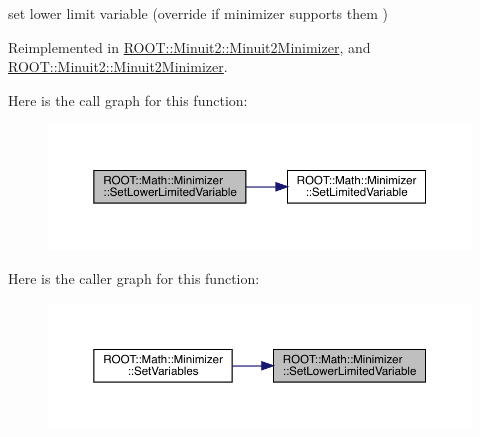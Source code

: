 set lower limit variable (override if minimizer supports them ) 



Reimplemented in \mbox{\hyperlink{classROOT_1_1Minuit2_1_1Minuit2Minimizer_af38926946e36f7030cfc1c298ab9b222}{R\+O\+O\+T\+::\+Minuit2\+::\+Minuit2\+Minimizer}}, and \mbox{\hyperlink{classROOT_1_1Minuit2_1_1Minuit2Minimizer_af38926946e36f7030cfc1c298ab9b222}{R\+O\+O\+T\+::\+Minuit2\+::\+Minuit2\+Minimizer}}.

Here is the call graph for this function\+:
\nopagebreak
\begin{figure}[H]
\begin{center}
\leavevmode
\includegraphics[width=350pt]{dc/dc4/classROOT_1_1Math_1_1Minimizer_a0fed20bdc58d05ce2b92d2bf47594dfb_cgraph}
\end{center}
\end{figure}
Here is the caller graph for this function\+:\nopagebreak
\begin{figure}[H]
\begin{center}
\leavevmode
\includegraphics[width=350pt]{dc/dc4/classROOT_1_1Math_1_1Minimizer_a0fed20bdc58d05ce2b92d2bf47594dfb_icgraph}
\end{center}
\end{figure}
\mbox{\label{classROOT_1_1Math_1_1Minimizer_a0fed20bdc58d05ce2b92d2bf47594dfb}} 
